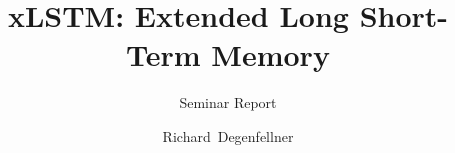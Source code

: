 \documentclass[a4paper,oneside,10pt,ngerman,english]{scrartcl}
\begin{document}

\title{xLSTM: Extended Long Short-Term Memory}


\subtitle{Seminar Report}

\author{Richard~Degenfellner }







\maketitle


\cleardoubleoddpage
\tableofcontents
\end{document}
